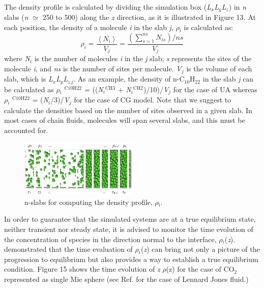 \documentclass[9pt,bestpractices]{livecoms}
\begin{document}
The density profile is calculated by dividing the simulation box
(\textit{L}$_{x}$\textit{L}$_{y}$\textit{L}$_{z}$) in \textit{n} slabs
(\textit{n} ${\simeq}$ 250 to 500) along the \textit{z} direction, as it is
illustrated in Figure 13\textit{.} At each position, the density of a molecule
\textit{i} in the slab \textit{j}, {${\rho}$}$_{i}$  is calculated as:
\begin{equation}
\rho_{i}=\frac{\left\langle N_{i}\right\rangle }{V_{j}}=\frac{\left(\sum_{s=1}^{ns}N_{is}\right)/ns}{V_{j}}
\end{equation}
where \textit{N}$_{i}$ is the number of molecules \textit{i} in the \textit{j}
slab; \textit{s} represents the sites of the molecule \textit{i}, and
\textit{ns} is the number of sites per molecule. \textit{V}$_{j}$ is the volume of each
slab, which is \textit{L}$_{x}$\textit{L}$_{y}$\textit{L}$_{z\,j}$. As an
example, the density of n-C$_{10}$H$_{22}$ in the slab \textit{j} can be
calculated as {${\rho}$}$_{i}$ $^{\mathrm{C10H22}}$
= ((\textit{N}$_{i}$$^{\mathrm{CH3}}$
+ \textit{N}$_{i}$$^{\mathrm{CH2}}$)/10)/\textit{V}$_{j}$ for the case of UA
whereas {${\rho}$}$_{i}$ $^{\mathrm{C10H22}}$
= (\textit{N}$_{i}$/3)/\textit{V}$_{j}$ for the case of CG model.
Note that we suggest to calculate the densities based on the number of sites observed
in a given slab. In most cases of chain fluids, molecules will span several slabs,
and this must be accounted for.

\begin{figure}
\includegraphics[width=0.5\textwidth]{gfx/image51.png}
\caption{n-slabs for computing the density profile, ${\rho}$$_{\mathrm{i}}$.}
\label{fig:7}
\end{figure}

In order to guarantee that the simulated systems are at a true equilibrium
state, neither transient nor steady state, it is advised to monitor the time
evolution of the concentration of species in the direction normal to the
interface, {${\rho}$}$_{i}$(\textit{z}). \citet{holcomb1993} demonstrated that the time evaluation of
{${\rho}$}$_{i}$(\textit{z}) can bring not only a picture of the progression to
equilibrium but also provides a way to establish a true equilibrium condition.
Figure 15 shows the time evolution of \textit{z} \textendash{} {${\rho}$}(z)
for the case of CO$_{2}$ represented as single Mie sphere (see Ref. \citep{mejia2005} for the case of
Lennard \textendash{} Jones fluid.) 
\end{document}
